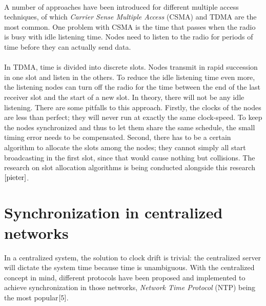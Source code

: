 \documentclass[a4paper,10pt]{report}
\begin{document}
\paragraph*{}
A number of approaches have been introduced for different multiple access techniques, of which \textit{Carrier Sense Multiple Access} (CSMA) and TDMA are the most common. One problem with CSMA is the time that passes when the radio is busy with idle listening time. Nodes need to listen to the radio for periods of time before they can actually send data.
\paragraph*{}
In TDMA, time is divided into discrete slots. Nodes transmit in rapid succession in one slot and listen in the others. To
reduce the idle listening time even more, the listening nodes can turn off the radio for the time between the end of the last receiver slot
and the start of a new slot. In theory, there will not be any idle listening. There are some pitfalls to this approach. Firstly, the
clocks of the nodes are less than perfect; they will never run at exactly the same clock-speed. To keep the nodes synchronized and
thus to let them share the same schedule, the small timing error needs to be compensated. Second, there has to be a certain algorithm
to allocate the slots among the nodes; they cannot simply all start broadcasting in the first slot, since that would cause nothing but
collisions. The research on slot allocation algorithms is being conducted alongside this research$\cite{pieter}$.
\section{\textbf{Synchronization in centralized networks}}
In a centralized system, the solution to clock drift is trivial: the centralized server will dictate the system time because time is unambiguous. With the centralized concept in mind, different protocols have been proposed and implemented to achieve synchronization in those networks, \textit{Network Time Protocol} (NTP) being the most popular$\cite{5}$.
\end{document}
